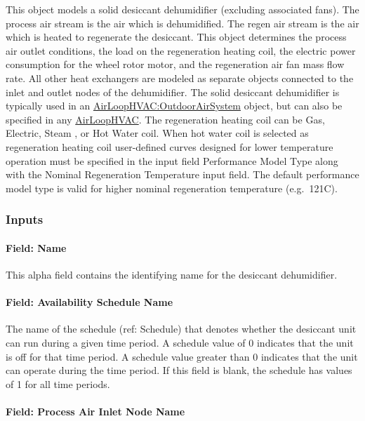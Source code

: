 This object models a solid desiccant dehumidifier (excluding associated fans). The process air stream is the air which is dehumidified. The regen air stream is the air which is heated to regenerate the desiccant. This object determines the process air outlet conditions, the load on the regeneration heating coil, the electric power consumption for the wheel rotor motor, and the regeneration air fan mass flow rate. All other heat exchangers are modeled as separate objects connected to the inlet and outlet nodes of the dehumidifier. The solid desiccant dehumidifier is typically used in an \hyperref[airloophvacoutdoorairsystem]{AirLoopHVAC:OutdoorAirSystem} object, but can also be specified in any \hyperref[airloophvac]{AirLoopHVAC}. The regeneration heating coil can be Gas, Electric, Steam , or Hot Water coil. When hot water coil is selected as regeneration heating coil user-defined curves designed for lower temperature operation must be specified in the input field Performance Model Type along with the Nominal Regeneration Temperature input field. The default performance model type is valid for higher nominal regeneration temperature (e.g.~121C).

\subsubsection{Inputs}\label{inputs-011}

\paragraph{Field: Name}\label{field-name-010}

This alpha field contains the identifying name for the desiccant dehumidifier.

\paragraph{Field: Availability Schedule Name}\label{field-availability-schedule-name-004}

The name of the schedule (ref: Schedule) that denotes whether the desiccant unit can run during a given time period. A schedule value of 0 indicates that the unit is off for that time period. A schedule value greater than 0 indicates that the unit can operate during the time period. If this field is blank, the schedule has values of 1 for all time periods.

\paragraph{Field: Process Air Inlet Node Name}\label{field-process-air-inlet-node-name}

